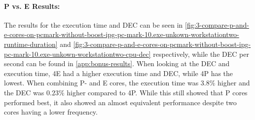 

\paragraph{P vs. E Results:} The results for the execution time and DEC can be seen in  \cref{fig:3-compare-p-and-e-cores-on-pcmark-without-boost-ipg-pc-mark-10.exe-unkown-workstationtwo-runtime-duration} and  \cref{fig:3-compare-p-and-e-cores-on-pcmark-without-boost-ipg-pc-mark-10.exe-unkown-workstationtwo-cpu-dec} respectively, while the DEC per second can be found in \cref{app:bonus-results}. When looking at the DEC and execution time, 4E had a higher execution time and DEC, while 4P has the lowest. When combining P- and E cores, the execution time was $3.8\%$ higher and the DEC was $0.23\%$ higher compared to 4P. While this still showed that P cores performed best, it also showed an almost equivalent performance despite two cores having a lower frequency.



